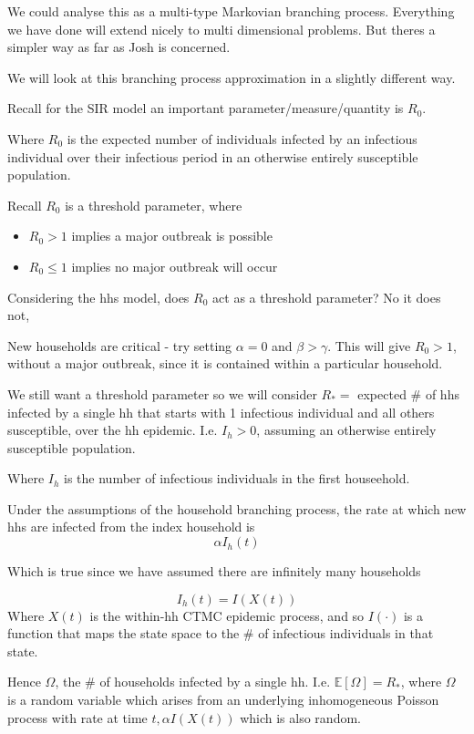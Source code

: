 \documentclass{/home/janmebows/Documents/LatexTemplates/myassignment}
\begin{document}
We could analyse this as a multi-type Markovian branching process. Everything we have done will extend nicely to multi dimensional problems. But theres a simpler way as far as Josh is concerned.

We will look at this branching process approximation in a slightly different way. 



Recall for the SIR model an important parameter/measure/quantity is $R_0$. 

Where $R_0$ is the expected number of individuals infected by an infectious individual over their infectious period in an otherwise entirely susceptible population.

Recall $R_0$ is a threshold parameter, where
\begin{itemize}
    \item $R_0 >1$ implies a major outbreak is possible
    \item $R_0 \leq 1$ implies no major outbreak will occur 
\end{itemize}


Considering the hhs model, does $R_0$ act as a threshold parameter?
No it does not, 

New households are critical - try setting $\alpha = 0$ and $\beta > \gamma$. This will give $R_0 > 1$, without a major outbreak, since it is contained within a particular household.

We still want a threshold parameter so we will consider
$R_* =$ expected \# of hhs infected by a single hh that starts with 1 infectious individual and all others susceptible, over the hh epidemic. I.e. $I_h > 0$, assuming an otherwise entirely susceptible population.

Where $I_h$ is the number of infectious individuals in the first houseehold.

Under the assumptions of the household branching process, the rate at which new hhs are infected from the index household is
\[\alpha I_h(t)\]

Which is true since we have assumed there are infinitely many households


\[I_h(t) = I(X(t))\]
Where $X(t)$ is the within-hh CTMC epidemic process, and so $I(\cdot)$ is a function that maps the state space to the $\#$ of infectious individuals in that state.

Hence $\Omega$, the $\#$ of households infected by a single hh. I.e. $\mathbb{E}\left[\Omega\right] = R_*$, where $\Omega$ is a random variable which arises from an underlying inhomogeneous Poisson process with rate at time $t, \alpha I(X(t))$ which is also random.
\end{document}
